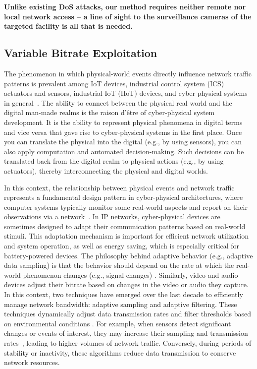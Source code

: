 \textbf{Unlike existing DoS attacks, our method requires neither remote nor local network access -- a line of sight to the surveillance cameras of the targeted facility is all that is needed.} 


\subsection{Variable Bitrate Exploitation}

The phenomenon in which physical-world events directly influence network traffic patterns is prevalent among IoT devices, industrial control system (ICS) actuators and sensors, industrial IoT (IIoT) devices, and cyber-physical systems in general~\cite{xu2018survey}.
The ability to connect between the physical real world and the digital man-made realms is the raison d'être of cyber-physical system development. 
It is the ability to represent physical phenomena in digital terms and vice versa that gave rise to cyber-physical systems in the first place. Once you can translate the physical into the digital (e.g., by using sensors), you can also apply computation and automated decision-making. Such decisions can be translated back from the digital realm to physical actions (e.g., by using actuators), thereby interconnecting the physical and digital worlds.

In this context, the relationship between physical events and network traffic represents a fundamental design pattern in cyber-physical architectures, where computer systems typically monitor some real-world aspects and report on their observations via a network~\cite{mois2016cyber}. 
In IP networks, cyber-physical devices are sometimes designed to adapt their communication patterns based on real-world stimuli. This adaptation mechanism is important for efficient network utilization and system operation, as well as energy saving, which is especially critical for battery-powered devices. The philosophy behind adaptive behavior (e.g., adaptive data sampling) is that the behavior should depend on the rate at which the real-world phenomenon changes (e.g., signal changes) \cite{waterSampling2017}. 
Similarly, video and audio devices adjust their bitrate based on changes in the video or audio they capture. 
In this context, two techniques have emerged over the last decade to efficiently manage network bandwidth: adaptive sampling and adaptive filtering. 
These techniques dynamically adjust data transmission rates and filter thresholds based on environmental conditions \cite{giouroukis2020survey}. 
For example, when sensors detect significant changes or events of interest, they may increase their sampling and transmission rates~\cite{anta2010sample,molhem2024novel}, leading to higher volumes of network traffic. Conversely, during periods of stability or inactivity, these algorithms reduce data transmission to conserve network resources. 

